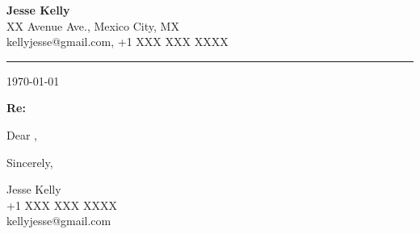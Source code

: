 \documentclass[letterpaper,11pt]{article}
\begin{document}
\begin{center}
\Large\textbf{Jesse Kelly} \\
XX Avenue Ave., Mexico City, MX \\
kellyjesse@gmail.com, +1 XXX XXX XXXX
\end{center}
\noindent\rule{\textwidth}{1pt}

\hfill \today

\vspace{2cm}
\textbf{Re: \position}

\vspace{0.5cm}
Dear \contact,


\vspace{0.5cm}

\vspace{0.5cm}


\vspace{2cm}
Sincerely,

\vspace{0.5cm}
Jesse Kelly \\
+1 XXX XXX XXXX \\
kellyjesse@gmail.com
\end{document}
